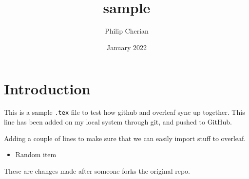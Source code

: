 \documentclass{article}
\title{sample}
\author{Philip Cherian}
\date{January 2022}
\begin{document}
\maketitle

\section{Introduction}

This is a sample \texttt{.tex} file to test how github and overleaf sync up together. This line has been added on my local system through git, and pushed to GitHub.

Adding a couple of lines to make sure that we can easily import stuff to overleaf.

\begin{itemize}
\item Random item
\end{itemize}

These are changes made after someone forks the original repo.
\end{document}
